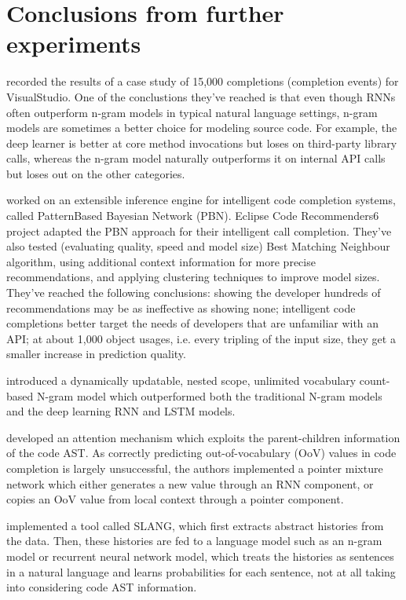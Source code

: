 \section{Conclusions from further experiments}
\cite{Hell19a} recorded the results of a case study of 15,000 completions (completion events) for VisualStudio. One of the conclustions they've reached is that even though RNNs often outperform n-gram models in typical natural language settings, n-gram models are sometimes a better choice for modeling source code. For example, the deep learner is better at core method invocations but loses on third-party library calls, whereas the n-gram model naturally outperforms it on internal API calls but loses out on the other categories.

\cite{Prok15a} worked on an extensible inference engine for intelligent code completion systems, called PatternBased Bayesian Network (PBN). Eclipse Code Recommenders6 project adapted the PBN approach for their intelligent call completion. They've also tested (evaluating quality, speed and model size) Best Matching Neighbour algorithm, using additional context information for more precise recommendations, and applying clustering techniques to improve model sizes. They've reached the following conclusions: showing the developer hundreds of recommendations may be as ineffective as showing none; intelligent code completions better target the needs of developers that are unfamiliar with an API; at about 1,000 object usages, i.e. every tripling of the input size, they get a smaller increase in prediction quality.

\cite{Hell17a} introduced a dynamically updatable, nested scope, unlimited vocabulary count-based N-gram model which outperformed both the traditional N-gram models and the deep learning RNN and LSTM models.

\cite{Li17a} developed an attention mechanism which exploits the parent-children information of the code AST. As correctly predicting out-of-vocabulary (OoV) values in code completion is largely unsuccessful, the authors implemented a pointer mixture network which either generates a new value through an RNN component, or copies an OoV value from local context through a pointer component.

\cite{Rayc14a} implemented a tool called SLANG, which ﬁrst extracts abstract histories from the data. Then, these histories are fed to a language model such as an n-gram model or recurrent neural network model, which treats the histories as sentences in a natural language and learns probabilities for each sentence, not at all taking into considering code AST information.

